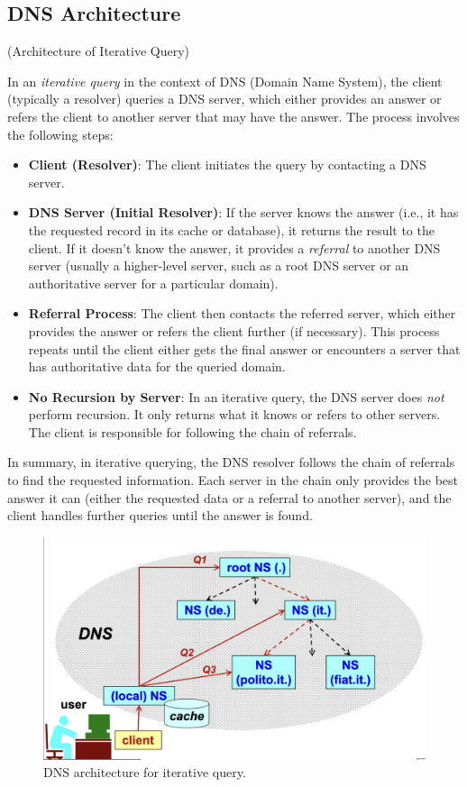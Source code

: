 \subsection*{DNS Architecture}
\begin{center}
    (Architecture of Iterative Query)
\end{center}

In an \textit{iterative query} in the context of DNS (Domain Name System), the client (typically a resolver) queries a DNS server, which either provides an answer or refers the client to another server that may have the answer. The process involves the following steps:

\begin{itemize}
    \item \textbf{Client (Resolver)}: The client initiates the query by contacting a DNS server.
    \item \textbf{DNS Server (Initial Resolver)}: If the server knows the answer (i.e., it has the requested record in its cache or database), it returns the result to the client. If it doesn't know the answer, it provides a \textit{referral} to another DNS server (usually a higher-level server, such as a root DNS server or an authoritative server for a particular domain).
    \item \textbf{Referral Process}: The client then contacts the referred server, which either provides the answer or refers the client further (if necessary). This process repeats until the client either gets the final answer or encounters a server that has authoritative data for the queried domain.
    \item \textbf{No Recursion by Server}: In an iterative query, the DNS server does \textit{not} perform recursion. It only returns what it knows or refers to other servers. The client is responsible for following the chain of referrals.
\end{itemize}

In summary, in iterative querying, the DNS resolver follows the chain of referrals to find the requested information. Each server in the chain only provides the best answer it can (either the requested data or a referral to another server), and the client handles further queries until the answer is found.

\begin{figure}[H]
    \centering
  \includegraphics[width=0.6\linewidth]{Images/NetSec/dns_architecture.png}
  \caption{DNS architecture for iterative query.}
\end{figure}

